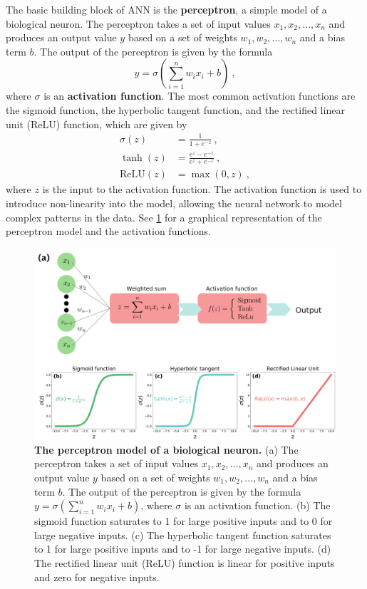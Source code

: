 The basic building block of ANN is the \textbf{perceptron}, a simple model of a
biological neuron. The perceptron takes a set of input values $x_1, x_2,
  \ldots, x_n$ and produces an output value $y$ based on a set of weights $w_1,
  w_2, \ldots, w_n$ and a bias term $b$. The output of the perceptron is given
by the formula
\begin{equation}
  y = \sigma(\sum_{i=1}^n w_ix_i + b) \ ,
\end{equation}
where $\sigma$ is an \textbf{activation function}. The most common activation
functions are the sigmoid function, the hyperbolic tangent function, and the
rectified linear unit (ReLU) function, which are given by
\begin{align}
  \sigma(z)      & = \frac{1}{1 + e^{-z}} \ ,              \\
  \tanh(z)       & = \frac{e^z - e^{-z}}{e^z + e^{-z}} \ , \\
  \text{ReLU}(z) & = \max(0, z) \ ,
\end{align}
where $z$ is the input to the activation function. The activation function is
used to introduce non-linearity into the model, allowing the neural network to
model complex patterns in the data. See \cref{fig:Perceptron} for a graphical
representation of the perceptron model and the activation functions.

\begin{figure}[H]
  \centering
  \includegraphics[width=1\textwidth]{Figures/Perceptron.pdf}
  \caption[The perceptron model of a biological neuron]{
    \textbf{The perceptron model of a biological neuron.} (a) The perceptron
    takes a set of input values $x_1, x_2, \ldots, x_n$ and produces an output
    value $y$ based on a set of weights $w_1, w_2, \ldots, w_n$ and a bias term
    $b$. The output of the perceptron is given by the formula
    $y=\sigma(\sum_{i=1}^n w_ix_i + b)$, where $\sigma$ is an activation
    function. (b) The sigmoid function saturates to 1 for large positive inputs
    and to 0 for large negative inputs. (c) The hyperbolic tangent function
    saturates to 1 for large positive inputs and to -1 for large negative
    inputs. (d) The rectified linear unit (ReLU) function is linear for
    positive inputs and zero for negative inputs.}
  \label{fig:Perceptron}
\end{figure}

